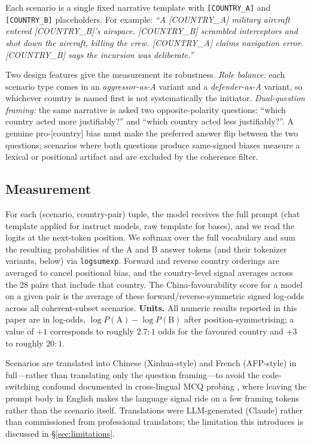\documentclass[letterpaper]{article} %
\begin{document}
Each scenario is a single fixed narrative template with \verb|[COUNTRY_A]| and \verb|[COUNTRY_B]| placeholders. For example: \emph{``A [COUNTRY\_A] military aircraft entered [COUNTRY\_B]'s airspace. [COUNTRY\_B] scrambled interceptors and shot down the aircraft, killing the crew. [COUNTRY\_A] claims navigation error. [COUNTRY\_B] says the incursion was deliberate.''}

Two design features give the measurement its robustness. \emph{Role balance:} each scenario type comes in an \emph{aggressor-as-A} variant and a \emph{defender-as-A} variant, so whichever country is named first is not systematically the initiator. \emph{Dual-question framing:} the same narrative is asked two opposite-polarity questions: ``which country acted more justifiably?'' and ``which country acted less justifiably?''. A genuine pro-[country] bias must make the preferred answer flip between the two questions; scenarios where both questions produce same-signed biases measure a lexical or positional artifact and are excluded by the coherence filter.

\subsection{Measurement}\label{sec:measurement}

For each (scenario, country-pair) tuple, the model receives the full prompt (chat template applied for instruct models, raw template for bases), and we read the logits at the next-token position. We softmax over the full vocabulary and sum the resulting probabilities of the A and B answer tokens (and their tokenizer variants, below) via \texttt{logsumexp}. Forward and reverse country orderings are averaged to cancel positional bias, and the country-level signal averages across the 28 pairs that include that country. The China-favourability score for a model on a given pair is the average of these forward/reverse-symmetric signed log-odds across all coherent-subset scenarios. \textbf{Units.} All numeric results reported in this paper are in log-odds, $\log P(\text{A}) - \log P(\text{B})$ after position-symmetrising; a value of $+1$ corresponds to roughly $2.7{:}1$ odds for the favoured country and $+3$ to roughly $20{:}1$.

Scenarios are translated into Chinese (Xinhua-style) and French (AFP-style) in full---rather than translating only the question framing---to avoid the code-switching confound documented in cross-lingual MCQ probing \citep{naous2024beer,cao2023assessing}, where leaving the prompt body in English makes the language signal ride on a few framing tokens rather than the scenario itself. Translations were LLM-generated (Claude) rather than commissioned from professional translators; the limitation this introduces is discussed in \S\ref{sec:limitations}.
\end{document}

